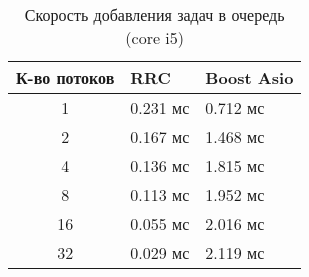\begin{table}[htb]
    \caption{\label{tab:core_asio}Скорость добавления задач в очередь (core i5)}
    \begin{center}
        \begin{tabularx}{\linewidth}{|c|X|X|}
            \hline
            К-во потоков & RRC & Boost Asio  \\
            \hline
            1 & 0.231 мс & 0.712 мс \\
            \hline
            2 & 0.167 мс & 1.468 мс \\
            \hline
            4 & 0.136 мс & 1.815 мс \\
            \hline
            8 & 0.113 мс & 1.952 мс \\
            \hline
            16 & 0.055 мс & 2.016 мс \\
            \hline
            32 & 0.029 мс & 2.119 мс \\
            \hline
        \end{tabularx}
    \end{center}
\end{table}